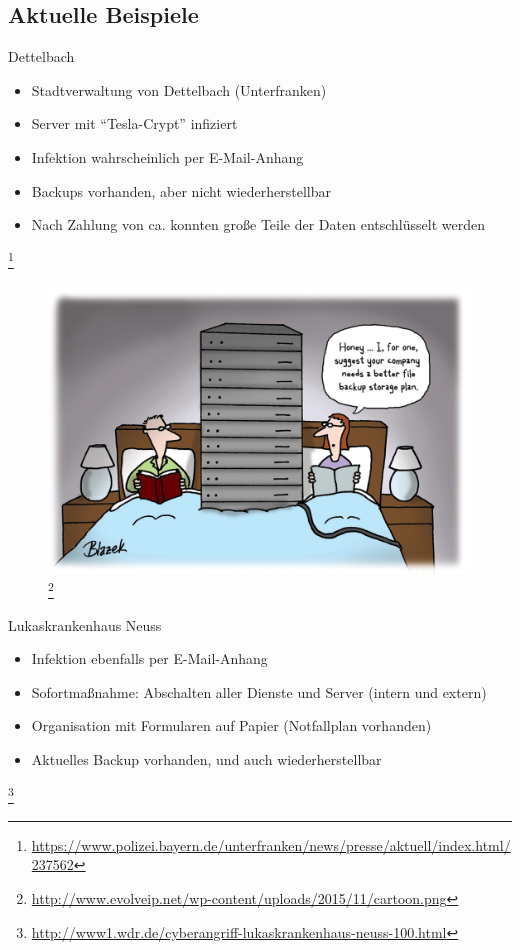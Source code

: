 \documentclass[notes,10pt]{beamer}
\begin{document}
\subsection{Aktuelle Beispiele}
\begin{frame}{Dettelbach}
	\begin{itemize}
		\item Stadtverwaltung von Dettelbach (Unterfranken)
		\item Server mit "`Tesla-Crypt"' infiziert
		\item Infektion wahrscheinlich per E-Mail-Anhang
		\item Backups vorhanden\pause , aber nicht wiederherstellbar
		\item Nach Zahlung von ca.  konnten große Teile der Daten entschlüsselt werden
	\end{itemize}
		
	\let\thefootnote\relax\footnote{\url{https://www.polizei.bayern.de/unterfranken/news/presse/aktuell/index.html/237562}}
\end{frame}
\begin{frame}[plain]
	\begin{figure}[p]
		\centering
		\includegraphics[scale=0.55]{backup_cartoon.png}
		\let\thefootnote\relax\footnote{\url{http://www.evolveip.net/wp-content/uploads/2015/11/cartoon.png}}
	\end{figure}
\end{frame}

\begin{frame}{Lukaskrankenhaus Neuss}

	\begin{itemize}
		\item Infektion ebenfalls per E-Mail-Anhang
		\item Sofortmaßnahme: Abschalten aller Dienste und Server (intern und extern) \pause
		\item Organisation mit Formularen auf Papier (Notfallplan vorhanden)
		\item Aktuelles Backup vorhanden\pause , und auch wiederherstellbar
	\end{itemize}
	\let\thefootnote\relax\footnote{\url{http://www1.wdr.de/cyberangriff-lukaskrankenhaus-neuss-100.html}}
\end{frame}
\end{document}
